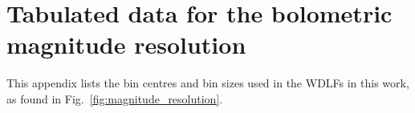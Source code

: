 \documentclass[fleqn,usenatbib]{mnras}
\begin{document}








\appendix

\section{Tabulated data for the bolometric magnitude resolution}
This appendix lists the bin centres and bin sizes used in the WDLFs in this work,
as found in Fig.~\ref{fig:magnitude_resolution}.
\end{document}

